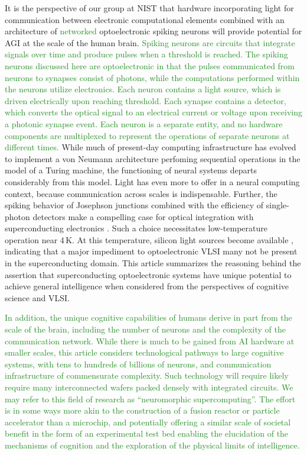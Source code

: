 \documentclass[twocolumn]{article}
\begin{document}
It is the perspective of our group at NIST that hardware incorporating light for communication between electronic computational elements combined with an architecture of \textcolor{ForestGreen}{networked} optoelectronic spiking neurons will provide potential for AGI at the scale of the human brain. \textcolor{ForestGreen}{Spiking neurons are circuits that integrate signals over time and produce pulses when a threshold is reached. The spiking neurons discussed here are optoelectronic in that the pulses communicated from neurons to synapses consist of photons, while the computations performed within the neurons utilize electronics. Each neuron contains a light source, which is driven electrically upon reaching threshold. Each synapse contains a detector, which converts the optical signal to an electrical current or voltage upon receiving a photonic synapse event. Each neuron is a separate entity, and no hardware components are multiplexed to represent the operations of separate neurons at different times.} While much of present-day computing infrastructure has evolved to implement a von Neumann architecture perfoming sequential operations in the model of a Turing machine, the functioning of neural systems departs considerably from this model. Light has even more to offer in a neural computing context, because communication across scales is indispensable. Further, the spiking behavior of Josephson junctions combined with the efficiency of single-photon detectors make a compelling case for optical integration with superconducting electronics \cite{shbu2017,sh2018}. Such a choice necessitates low-temperature operation near 4\,K. At this temperature, silicon light sources become available \cite{buch2017}, indicating that a major impediment to optoelectronic VLSI many not be present in the superconducting domain. This article summarizes the reasoning behind the assertion that superconducting optoelectronic systems have unique potential to achieve general intelligence when considered from the perspectives of cognitive science and VLSI.

\textcolor{ForestGreen}{In addition, the unique cognitive capabilities of humans derive in part from the scale of the brain, including the number of neurons and the complexity of the communication network. While there is much to be gained from AI hardware at smaller scales, this article considers technological pathways to large cognitive systems, with tens to hundreds of billions of neurons, and communication infrastructure of commensurate complexity. Such technology will require likely require many interconnected wafers packed densely with integrated circuits. We may refer to this field of research as ``neuromorphic supercomputing''. The effort is in some ways more akin to the construction of a fusion reactor or particle accelerator than a microchip, and potentially offering a similar scale of societal benefit in the form of an experimental test bed enabling the elucidation of the mechanisms of cognition and the exploration of the physical limits of intelligence.}
\end{document}
